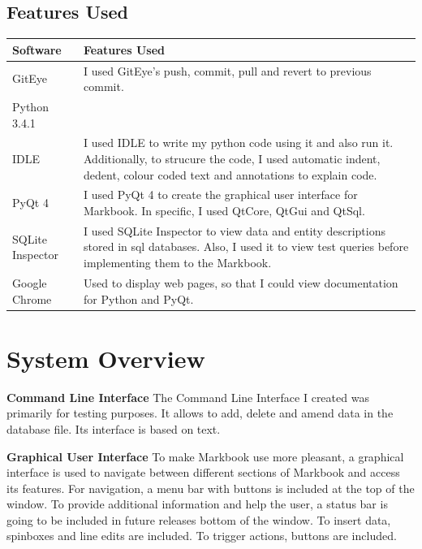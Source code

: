 \subsection{Features Used}
\begin{center}
    \begin{tabular}{|p{2cm}|p{8cm}|}
        \hline
        \textbf{Software} &  \textbf{Features Used}\\ \hline
        \hline
GitEye & I used GitEye's push, commit, pull and revert to previous commit.
        \\ \hline
Python 3.4.1 & 
        \\ \hline
IDLE & I used IDLE to write my python code using it and also run it. Additionally, to strucure the code, I used automatic indent, dedent, colour coded text and annotations to explain code. 
        \\ \hline
PyQt 4 & I used PyQt 4 to create the graphical user interface for Markbook. In specific, I used QtCore, QtGui and QtSql.  
        \\ \hline
SQLite Inspector & I used SQLite Inspector to view data and entity descriptions stored in sql databases. Also, I used it to view test queries before implementing them to the Markbook.
       \\ \hline
Google Chrome & Used to display web pages, so that I could view documentation for Python and PyQt.
\\ \hline
    \end{tabular}
\end{center}


\section{System Overview}
\textbf{Command Line Interface}
The Command Line Interface I created was primarily for testing purposes. It allows to  add, delete and amend data in the database file. Its interface is based on text.

\textbf{Graphical User Interface}
To make Markbook use more pleasant, a graphical interface is used to navigate between different sections of Markbook and access its features. For navigation, a menu bar with buttons is included at the top of the window. To provide additional information and help the user, a status bar is going to be included in future releases bottom of the window. To insert data, spinboxes and line edits are included. To trigger actions, buttons are included.

